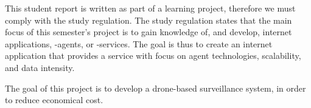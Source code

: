 This student report is written as part of a learning project, therefore we must comply with the study regulation.
The study regulation states that the main focus of this semester’s project is to gain knowledge of, and develop, internet applications, -agents, or -services.
The goal is thus to create an internet application that provides a service with focus on agent technologies, scalability, and data intensity.

The goal of this project is to develop a drone-based surveillance system, in order to reduce economical cost.